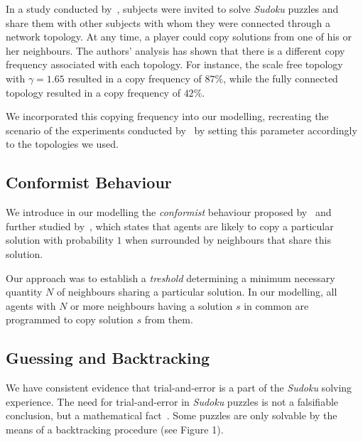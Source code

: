 \documentclass[letterpaper]{article}
\begin{document}
In a study conducted by~\cite{farenzena:collabem}, subjects were invited to solve {\em Sudoku} puzzles and share them with other subjects with whom they were connected through a network topology. At any time, a player could copy solutions from one of his or her neighbours. The authors' analysis has shown that there is a different copy frequency associated with each topology. For instance, the scale free topology with $\gamma = 1.65$ resulted in a copy frequency of $87 \%$, while the fully connected topology resulted in a copy frequency of $42 \%$.

We incorporated this copying frequency into our modelling, recreating the scenario of the experiments conducted by~\cite{farenzena:collabem} by setting this parameter accordingly to the topologies we used.

\subsection{Conformist Behaviour}

We introduce in our modelling the {\em conformist} behaviour proposed by~\cite{cefferson:conformists} and further studied by~\cite{farenzena:collabem}, which states that agents are likely to copy a particular solution with probability $1$ when surrounded by neighbours that share this solution. 

Our approach was to establish a {\em treshold} determining a minimum necessary quantity $N$ of neighbours sharing a particular solution. In our modelling, all agents with $N$ or more neighbours having a solution $s$ in common are programmed to copy solution $s$ from them.

\subsection{Guessing and Backtracking}

We have consistent evidence that trial-and-error is a part of the {\em Sudoku} solving experience. The need for trial-and-error in {\em Sudoku} puzzles is not a falsifiable conclusion, but a mathematical fact~\cite{davis:mathsudoku}. Some puzzles are only solvable by the means of a backtracking procedure (see Figure 1).
\end{document}
